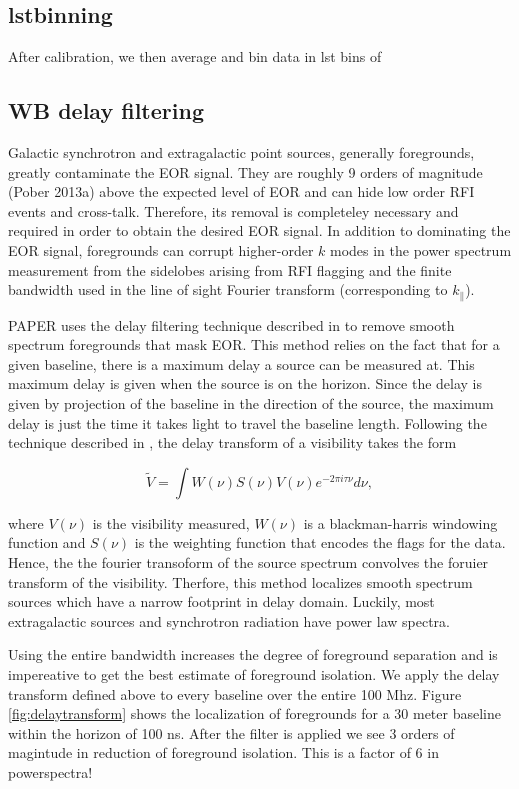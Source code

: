 \documentclass[twocolumn,numberedappendix]{emulateapj}
\begin{document}
\subsection{lstbinning}
After calibration, we then average and bin data in lst bins of 

\subsection{WB delay filtering}
Galactic synchrotron and extragalactic point sources, generally foregrounds,
greatly contaminate the EOR signal. They are roughly 9 orders of magnitude
(Pober 2013a) above the expected level of EOR and can hide low order RFI events
and cross-talk.  Therefore, its removal is completeley necessary and required in
order to obtain the desired EOR signal. In addition to dominating the EOR
signal, foregrounds can corrupt higher-order $k$ modes in the power spectrum
measurement from the sidelobes arising from RFI flagging and the finite
bandwidth used in the line of sight Fourier transform (corresponding to
$k_{\parallel}$). 

PAPER uses the delay filtering technique described in \citep{parsons_2012b} to
remove smooth spectrum foregrounds that mask EOR. This method relies on the fact
that for a given baseline, there is a maximum delay a source can be measured at.
This maximum delay is given when the source is on the horizon. Since the 
delay is given by projection of the baseline in the direction of the source, the
maximum delay is just the time it takes light to travel the baseline length. 
Following the technique described in \citep{parsons_2012b}, the delay transform
of a visibility takes the form 

\begin{equation}\label{eqn:delay_transform}
    \tilde{V} = \int{W(\nu)S(\nu)V(\nu)e^{-2\pi{i}\tau\nu}d\nu},
\end{equation}

where $V(\nu)$ is the visibility measured, $W(\nu)$ is a blackman-harris
windowing function and $S(\nu)$ is the weighting function that encodes the flags
for the data. Hence, the the fourier transoform of the source spectrum convolves
the foruier transform of the visibility. Therfore, this method localizes smooth
spectrum sources which have a narrow footprint in delay domain. Luckily, most
extragalactic sources and synchrotron radiation have power law spectra.

Using the entire bandwidth increases the degree of foreground separation and is
impereative to get the best estimate of foreground isolation. We apply the delay
transform defined above to every baseline over the entire 100 Mhz. Figure
\ref{fig:delaytransform} shows the localization of foregrounds for a 30 meter
baseline within the horizon of 100 ns. After the filter is applied we see 3
orders of magintude in reduction of foreground isolation.  This is a factor of 6
in powerspectra! 
\end{document}
